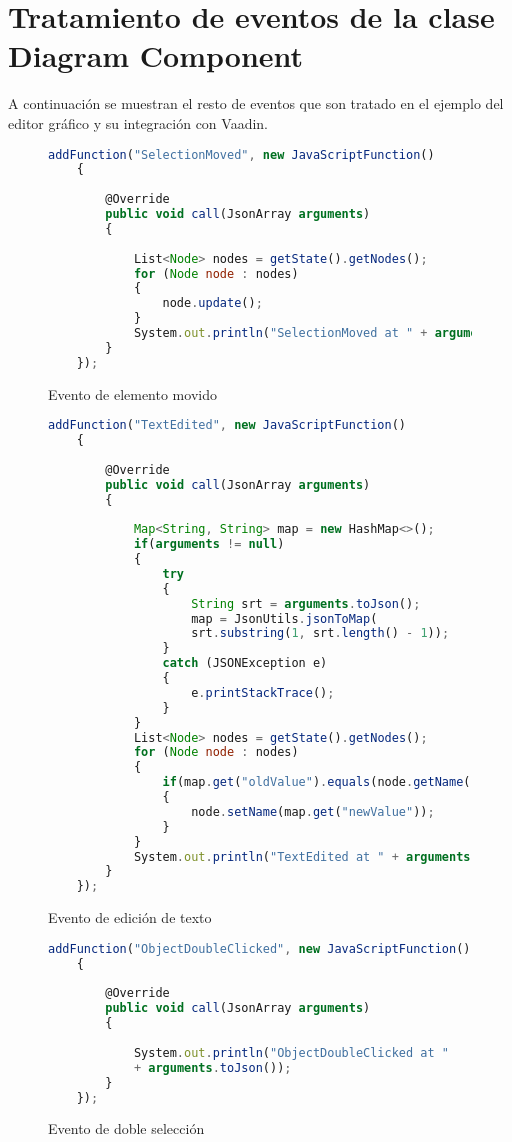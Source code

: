 \appendix
\chapter{Tratamiento de eventos de la clase Diagram Component}\label{aped.A}
A continuación se muestran el resto de eventos que son tratado en el ejemplo del editor gráfico y su integración con Vaadin.

\begin{figure}[H]
	\centering
	\begin{lstlisting}[language=Javascript]
	addFunction("SelectionMoved", new JavaScriptFunction()
	{
	
		@Override
		public void call(JsonArray arguments)
		{
		
			List<Node> nodes = getState().getNodes();
			for (Node node : nodes)
			{
				node.update();
			}
			System.out.println("SelectionMoved at " + arguments.toJson());
		}
	});\end{lstlisting}
	\caption{Evento de elemento movido}
	\label{fig:selectionMoved}
\end{figure}


\begin{figure}[H]
	\centering
	\begin{lstlisting}[language=Javascript]
	addFunction("TextEdited", new JavaScriptFunction()
	{
	
		@Override
		public void call(JsonArray arguments)
		{
		
			Map<String, String> map = new HashMap<>();
			if(arguments != null)
			{
				try
				{
					String srt = arguments.toJson();
					map = JsonUtils.jsonToMap(
					srt.substring(1, srt.length() - 1));
				}
				catch (JSONException e)
				{
					e.printStackTrace();
				}
			}
			List<Node> nodes = getState().getNodes();
			for (Node node : nodes)
			{
				if(map.get("oldValue").equals(node.getName()))
				{
					node.setName(map.get("newValue"));
				}	
			}
			System.out.println("TextEdited at " + arguments.toJson());
		}
	});\end{lstlisting}
	\caption{Evento de edición de texto}
	\label{fig:textEdited}
\end{figure}


\begin{figure}[H]
	\centering
	\begin{lstlisting}[language=Javascript]
	addFunction("ObjectDoubleClicked", new JavaScriptFunction()
	{
	
		@Override
		public void call(JsonArray arguments)
		{
		
			System.out.println("ObjectDoubleClicked at " 
			+ arguments.toJson());
		}
	});\end{lstlisting}
	\caption{Evento de doble selección}
	\label{fig:doubleClick}
\end{figure}
